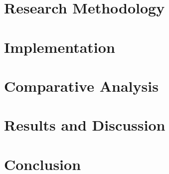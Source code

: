\documentclass[12pt,a4paper,oneside]{report}
\begin{document}

\chapter{Research Methodology}
\label{ch:methodology}


\chapter{Implementation}
\label{ch:implementation}


\chapter{Comparative Analysis}
\label{ch:analysis}


\chapter{Results and Discussion}
\label{ch:results}


\chapter{Conclusion}
\label{ch:conclusion}

\end{document}
